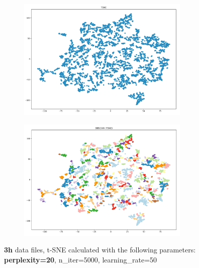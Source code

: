 \begin{figure}[H]
  \centering
	\begin{subfigure}{.5\textwidth}
    \centering
    \includegraphics[width=0.9\textwidth]{./images/tsneParametersTest/perplexity/perp20-3hTSNE.png}
  \end{subfigure}%
  \begin{subfigure}{.5\textwidth}
    \centering
    \includegraphics[width=0.9\textwidth]{./images/tsneParametersTest/perplexity/perp20-3hDBSCAN.png}
	\end{subfigure}
	\caption{\textbf{3h} data files, t-SNE calculated with the following parameters: \textbf{perplexity=20}, n\_iter=5000, learning\_rate=50}
  \label{figure:3hperp20TSNE}
\end{figure}



